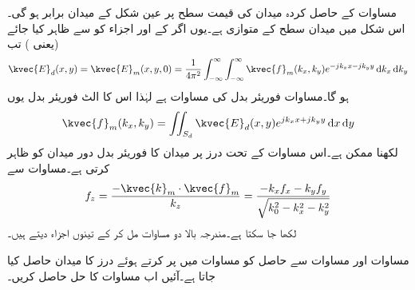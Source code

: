 مساوات  کے حاصل کردہ میدان کی قیمت سطح  پر  عین شکل  کے میدان برابر ہو گی۔اس شکل میں میدان  سطح کے متوازی ہے۔یوں اگر  کے  اور  اجزاء کو  سے ظاہر کیا جائے (یعنی ) تب
\begin{align}\label{مساوات_اینٹینا_دور_میدان_فوریئر_الف}
\kvec{E}_d (x,y)=\kvec{E}_m(x,y,0)=\frac{1}{4\pi^2} \int_{-\infty}^{\infty} \int_{-\infty}^{\infty} \kvec{f}_m(k_x,k_y)e^{-j k_x x -j k_y y} \dif k_x \dif k_y
\end{align}
ہو گا۔مساوات  فوریئر بدل کی مساوات ہے لہٰذا اس کا الٹ فوریئر بدل یوں
\begin{align}\label{مساوات_اینٹینا_دور_میدان_فوریئر_ب}
\kvec{f}_m(k_x,k_y)=\iint_{S_d} \kvec{E}_d(x,y) e^{j k_x x +j k_y y} \dif x \dif y
\end{align}
 لکھنا ممکن ہے۔اس مساوات کے تحت درز پر میدان کا فوریئر بدل دور میدان کو ظاہر کرتی ہے۔مساوات  سے
\begin{align}\label{مساوات_اینٹینا_دور_میدان_فوریئر_پ}
f_z=\frac{-\kvec{k}_m\cdot\kvec{f}_m}{k_z}=\frac{-k_x f_x-k_y f_y}{\sqrt{k_0^2-k_x^2-k_y^2}}
\end{align}
لکھا جا سکتا ہے۔مندرجہ بالا دو مساوات مل کر   کے تینوں اجزاء دیتے ہیں۔

مساوات  اور مساوات  سے حاصل   کو مساوات  میں پر کرتے ہوئے درز کا میدان حاصل کیا جاتا ہے۔آئیں اب مساوات  کا حل حاصل کریں۔

